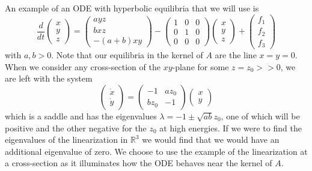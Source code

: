 \documentclass[11pt]{article}
\newcommand{\R}{\mathbb{R}}
\begin{document}
An example of an ODE with hyperbolic equilibria that we will use is \begin{equation}\label{eq:hyperbolic}
    \frac{d}{dt} \begin{pmatrix} x \\ y \\ z 
    \end{pmatrix} = \begin{pmatrix}
        ayz\\
        bxz\\
        -(a+b)xy
    \end{pmatrix} - \begin{pmatrix}
        1 & 0 & 0 \\
        0 & 1 & 0 \\ 
        0 & 0 & 0 
    \end{pmatrix} \begin{pmatrix} x \\ y \\ z 
    \end{pmatrix} 
    + 
    \begin{pmatrix} f_1 \\ f_2 \\ f_3
    \end{pmatrix}
\end{equation}with $a, b > 0$. Note that our equilibria in the kernel of $A$ are the line $x = y = 0$. When we consider any cross-section of the $xy$-plane for some $z = z_0 >>0$, we are left with the system $$\begin{pmatrix}
    \dot{x}\\
    \dot{y}
\end{pmatrix} = \begin{pmatrix}
    -1 & az_0\\
    bz_0 & -1
\end{pmatrix} \begin{pmatrix}
    x\\
    y
\end{pmatrix}$$which is a saddle and has the eigenvalues $\lambda = -1 \pm \sqrt{ab}z_0$, one of which will be positive and the other negative for the $z_0$ at high energies. If we were to find the eigenvalues of the linearization in $\R^3$ we would find that we would have an additional eigenvalue of zero. We choose to use the example of the linearization at a cross-section as it illuminates how the ODE behaves near the kernel of $A$. 
\end{document}
